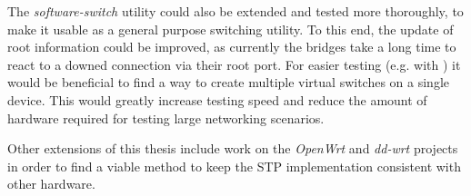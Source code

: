 The \textit{software-switch} utility could also be extended and tested more thoroughly, to make it usable as a general purpose switching utility.
To this end, the update of root information could be improved, as currently the bridges take a long time to react to a downed connection via their root port.
For easier testing (e.g. with \tool) it would be beneficial to find a way to create multiple virtual switches on a single device.
This would greatly increase testing speed and reduce the amount of hardware required for testing large networking scenarios. 

Other extensions of this thesis include work on the \textit{OpenWrt} and \textit{dd-wrt} projects in order to find a viable method to keep the STP implementation consistent with other hardware.
